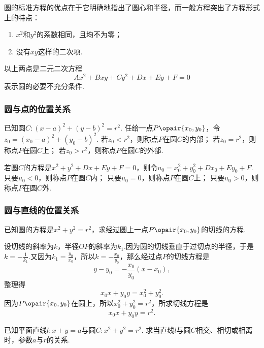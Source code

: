 圆的标准方程的优点在于它明确地指出了圆心和半径，而一般方程突出了方程形式上的特点：\begin{enumerate}
\item \(x^2\)和\(y^2\)的系数相同，且均不为零；
\item 没有\(xy\)这样的二次项.
\end{enumerate}以上两点是二元二次方程\[
A x^2 + B xy + C y^2 + D x + E y + F = 0
\]表示圆的必要不充分条件.

\subsubsection{圆与点的位置关系}
已知圆\(C: (x-a)^2+(y-b)^2=r^2\).
任给一点\(P\opair{x_0,y_0}\)，令\(z_0 = (x_0-a)^2+(y_0-b)^2\).
若\(z_0 < r^2\)，则称点\(P\)在圆\(C\)的内部；
若\(z_0 = r^2\)，则称点\(P\)在圆\(C\)上；
若\(z_0 > r^2\)，则称点\(P\)在圆\(C\)的外部.

若圆\(C\)的方程是\(x^2+y^2+Dx+Ey+F=0\)，则令\(u_0 = x_0^2+y_0^2+Dx_0+Ey_0+F\).
只要\(u_0 < 0\)，则称点\(P\)在圆\(C\)内；
只要\(u_0 = 0\)，则称点\(P\)在圆\(C\)上；
只要\(u_0 > 0\)，则称点\(P\)在圆\(C\)外.

\subsubsection{圆与直线的位置关系}
\begin{example}
已知圆的方程是\(x^2+y^2 = r^2\)，求经过圆上一点\(P\opair{x_0,y_0}\)的切线的方程.
\begin{solution}
设切线的斜率为\(k\)，半径\(OP\)的斜率为\(k_1\).因为圆的切线垂直于过切点的半径，于是\(k = -\frac{1}{k_1}\).又因为\(k_1 = \frac{y_0}{x_0}\)，所以\(k = -\frac{x_0}{y_0}\)，那么经过点\(P\)的切线方程是\[
y-y_0 = -\frac{x_0}{y_0} (x-x_0),
\]整理得\[
x_0 x + y_0 y = x_0^2 + y_0^2.
\]因为\(P\opair{x_0,y_0}\)在圆上，所以\(x_0^2 + y_0^2 = r^2\)，所求切线方程是\begin{equation}
x_0 x + y_0 y = r^2.
\end{equation}
\end{solution}
\end{example}

\begin{example}
已知平面直线\(l: x + y = a\)与圆\(C: x^2 + y^2 = r^2\).
求当直线\(l\)与圆\(C\)相交、相切或相离时，参数\(a\)与\(r\)的关系.
\end{example}


